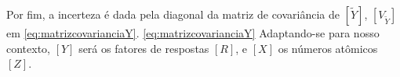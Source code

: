  

\begin{table}[H]
  \begin{scriptsize} 
  
  \end{scriptsize}
  \caption{}
\end{table}

\begin{table}[H]
  
  \begin{scriptsize} %
  \caption{}
  
  \end{scriptsize}
\end{table}


\begin{table}[H]
  
  \begin{footnotesize} %
  \caption{}
  
  \end{footnotesize}
\end{table}

\begin{table}[H]
  
  \begin{footnotesize} %
  \caption{}
  
  \end{footnotesize}
\end{table}




Por fim, a incerteza é dada pela diagonal da matriz de covariância 
de $[\tilde{Y}]$, $[V_{\tilde{Y}}]$ em \ref{eq:matrizcovarianciaY}.
\ref{eq:matrizcovarianciaY}
Adaptando-se para nosso contexto, $[Y]$ será os fatores de respostas $[R]$,
e $[X]$ os números atômicos $[Z]$.

